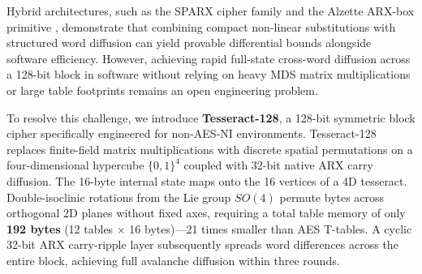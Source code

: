 \documentclass[10pt,twocolumn]{article}
\begin{document}
Hybrid architectures, such as the SPARX cipher family \cite{dunkelman2016sparx} and the Alzette ARX-box primitive \cite{beierle2020alzette}, demonstrate that combining compact non-linear substitutions with structured word diffusion can yield provable differential bounds alongside software efficiency. However, achieving rapid full-state cross-word diffusion across a 128-bit block in software without relying on heavy MDS matrix multiplications or large table footprints remains an open engineering problem.

To resolve this challenge, we introduce \textbf{Tesseract-128}, a 128-bit symmetric block cipher specifically engineered for non-AES-NI environments. Tesseract-128 replaces finite-field matrix multiplications with discrete spatial permutations on a four-dimensional hypercube $\{0,1\}^4$ coupled with 32-bit native ARX carry diffusion. The 16-byte internal state maps onto the 16 vertices of a 4D tesseract. Double-isoclinic rotations from the Lie group $SO(4)$ permute bytes across orthogonal 2D planes without fixed axes, requiring a total table memory of only \textbf{192 bytes} (12 tables $\times$ 16 bytes)---21 times smaller than AES T-tables. A cyclic 32-bit ARX carry-ripple layer subsequently spreads word differences across the entire block, achieving full avalanche diffusion within three rounds.
\end{document}
